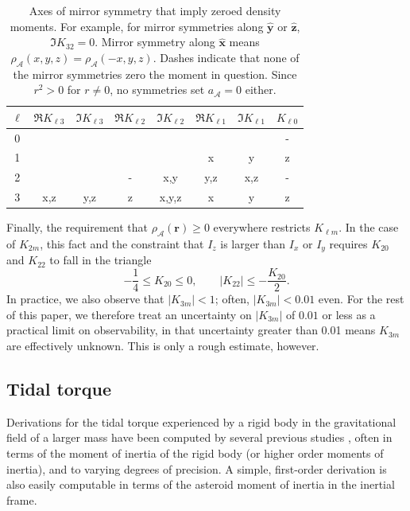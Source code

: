 \documentclass[fleqn,usenatbib]{mnras}
\newcommand{\unit}[1]{\bm{\hat{#1}}}
\begin{document}
\begin{table}
  \centering
  \begin{tabular}{c|ccccccc}
    \hline
    $\ell$ & $\Re K_{\ell 3}$ & $\Im K_{\ell 3}$ & $\Re K_{\ell 2}$ & $\Im K_{\ell 2}$ & $\Re K_{\ell 1}$ & $\Im K_{\ell 1}$ & $K_{\ell 0}$ \\ \hline
    0 &  &  &  &  &  &  & -\\ 
    1 &  &  &  &  & x & y & z\\ 
    2 &  &  & - & x,y & y,z & x,z & -\\ 
    3 & x,z & y,z & z & x,y,z & x & y & z\\ \hline
  \end{tabular}
  \caption{Axes of mirror symmetry that imply zeroed density moments. For example, for mirror symmetries along $\unit y$ or $\unit z$, $\Im K_{32}=0$. Mirror symmetry along $\unit x$ means $\rho_\mathcal{A}(x, y, z) = \rho_\mathcal{A}(-x, y, z)$. Dashes indicate that none of the mirror symmetries zero the moment in question. Since $r^2>0$ for $r\neq 0$, no symmetries set $a_\mathcal{A}=0$ either.}
  \label{tab:klm-symmetries}
\end{table} 

Finally, the requirement that $\rho_\mathcal{A}(\bm r) \geq 0$ everywhere restricts $K_{\ell m}$. In the case of $K_{2m}$, this fact and the constraint that $I_z$ is larger than $I_x$ or $I_y$ requires $K_{20}$ and $K_{22}$ to fall in the triangle
\begin{equation}
  -\frac{1}{4} \leq K_{20} \leq 0, \qquad |K_{22}| \leq -\frac{K_{20}}{2}.
  \label{eqn:parameter-bounds}
\end{equation}
In practice, we also observe that $|K_{3m}| < 1$; often, $|K_{3m}| < 0.01$ even. For the rest of this paper, we therefore treat an uncertainty on $|K_{3m}|$ of $0.01$ or less as a practical limit on observability, in that uncertainty greater than 0.01 means $K_{3m}$ are effectively unknown. This is only a rough estimate, however.





\subsection{Tidal torque}
\label{sec:tidal-torque}

Derivations for the tidal torque experienced by a rigid body in the gravitational field of a larger mass have been computed by several previous studies \cite{paul88,HouMar2017,BOUE2009750, ashenberg07}, often in terms of the moment of inertia of the rigid body (or higher order moments of inertia), and to varying degrees of precision. A simple, first-order derivation is also easily computable in terms of the asteroid moment of inertia in the inertial frame.
\end{document}
